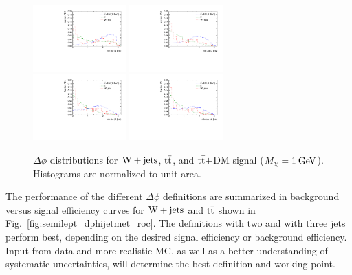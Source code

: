\begin{figure}[htbp]
  \centering
  \includegraphics[width=0.32\textwidth]{figures/semilept-overlay-dphijetmet2.pdf}
  \includegraphics[width=0.32\textwidth]{figures/semilept-overlay-dphijetmet3.pdf} \\
  \includegraphics[width=0.32\textwidth]{figures/semilept-overlay-dphijetmet4.pdf}
  \includegraphics[width=0.32\textwidth]{figures/semilept-overlay-dphijetmet.pdf}
  \caption{$\Delta\phi$ distributions for $\mathrm{W+jets}$, $\mathrm{t}\bar{\mathrm{t}}$, and $\mathrm{t}\bar{\mathrm{t}}+$DM signal ($M_\chi = 1\:\mathrm{Ge\kern -0.1em V}$). Histograms are normalized to unit area.}
  \label{fig:semilept_overlay_dphijetmet}
\end{figure}

The performance of the different $\Delta\phi$ definitions are summarized in background versus signal efficiency curves for $\mathrm{W+jets}$ and $\mathrm{t}\bar{\mathrm{t}}$ shown in Fig.~\ref{fig:semilept_dphijetmet_roc}. The definitions with two and with three jets perform best, depending on the desired signal efficiency or background efficiency. Input from data and more realistic MC, as well as a better understanding of systematic uncertainties, will determine the best definition and working point.

